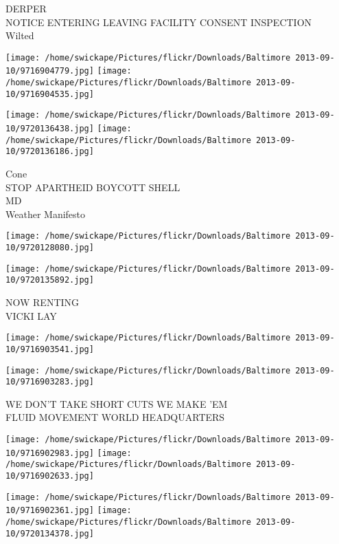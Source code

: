 \documentclass[10pt,letterpaper]{article}
\begin{document}
DERPER\\
NOTICE ENTERING LEAVING FACILITY CONSENT INSPECTION\\
Wilted\\
\pagebreak

\texttt{[image: /home/swickape/Pictures/flickr/Downloads/Baltimore 2013-09-10/9716904779.jpg]}
\texttt{[image: /home/swickape/Pictures/flickr/Downloads/Baltimore 2013-09-10/9716904535.jpg]}

\texttt{[image: /home/swickape/Pictures/flickr/Downloads/Baltimore 2013-09-10/9720136438.jpg]}
\texttt{[image: /home/swickape/Pictures/flickr/Downloads/Baltimore 2013-09-10/9720136186.jpg]}

Cone\\
STOP APARTHEID BOYCOTT SHELL\\
MD\\
Weather Manifesto\\
\pagebreak

\texttt{[image: /home/swickape/Pictures/flickr/Downloads/Baltimore 2013-09-10/9720128080.jpg]}

\vspace{0.25in}
\texttt{[image: /home/swickape/Pictures/flickr/Downloads/Baltimore 2013-09-10/9720135892.jpg]}

NOW RENTING\\
VICKI LAY\\
\pagebreak

\texttt{[image: /home/swickape/Pictures/flickr/Downloads/Baltimore 2013-09-10/9716903541.jpg]}

\vspace{0.25in}
\texttt{[image: /home/swickape/Pictures/flickr/Downloads/Baltimore 2013-09-10/9716903283.jpg]}

WE DON'T TAKE SHORT CUTS WE MAKE 'EM\\
FLUID MOVEMENT WORLD HEADQUARTERS\\
\pagebreak

\texttt{[image: /home/swickape/Pictures/flickr/Downloads/Baltimore 2013-09-10/9716902983.jpg]}
\texttt{[image: /home/swickape/Pictures/flickr/Downloads/Baltimore 2013-09-10/9716902633.jpg]}

\texttt{[image: /home/swickape/Pictures/flickr/Downloads/Baltimore 2013-09-10/9716902361.jpg]}
\texttt{[image: /home/swickape/Pictures/flickr/Downloads/Baltimore 2013-09-10/9720134378.jpg]}
\end{document}
